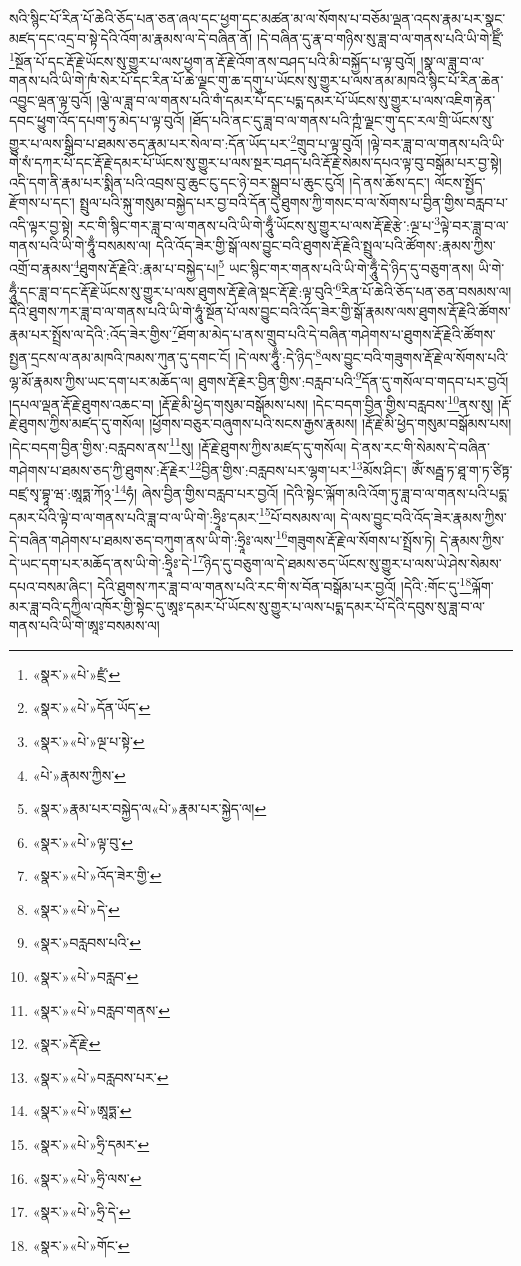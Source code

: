 སའི་སྙིང་པོ་རིན་པོ་ཆེའི་ཅོད་པན་ཅན་ཞལ་དང་ཕྱག་དང་མཚན་མ་ལ་སོགས་པ་བཅོམ་ལྡན་འདས་རྣམ་པར་སྣང་མཛད་དང་འདྲ་བ་སྟེ་དེའི་འོག་མ་རྣམས་ལ་དེ་བཞིན་ནོ། །དེ་བཞིན་དུ་རྣ་བ་གཉིས་སུ་ཟླ་བ་ལ་གནས་པའི་ཡི་གེ་ཛྲིཾ་\footnote{«སྣར་»«པེ་»ཛྲཾ་}སྔོན་པོ་དང་རྡོ་རྗེ་ཡོངས་སུ་གྱུར་པ་ལས་ཕྱག་ན་རྡོ་རྗེ་འོག་ནས་བཤད་པའི་མི་བསྐྱོད་པ་ལྟ་བུའོ། །སྣ་ལ་ཟླ་བ་ལ་གནས་པའི་ཡི་གེ་ཁཾ་སེར་པོ་དང་རིན་པོ་ཆེ་ལྗང་གུ་ཆ་དགུ་པ་ཡོངས་སུ་གྱུར་པ་ལས་ནམ་མཁའི་སྙིང་པོ་རིན་ཆེན་འབྱུང་ལྡན་ལྟ་བུའོ། །ལྕེ་ལ་ཟླ་བ་ལ་གནས་པའི་གཾ་དམར་པོ་དང་པདྨ་དམར་པོ་ཡོངས་སུ་གྱུར་པ་ལས་འཇིག་རྟེན་དབང་ཕྱུག་འོད་དཔག་ཏུ་མེད་པ་ལྟ་བུའོ། །ཐོད་པའི་ནང་དུ་ཟླ་བ་ལ་གནས་པའི་ཀྵཾ་ལྗང་གུ་དང་རལ་གྲི་ཡོངས་སུ་གྱུར་པ་ལས་སྒྲིབ་པ་ཐམས་ཅད་རྣམ་པར་སེལ་བ་:དོན་ཡོད་པར་\footnote{«སྣར་»«པེ་»དོན་ཡོད་}གྲུབ་པ་ལྟ་བུའོ། །ལྟེ་བར་ཟླ་བ་ལ་གནས་པའི་ཡི་གེ་སཾ་དཀར་པོ་དང་རྡོ་རྗེ་དམར་པོ་ཡོངས་སུ་གྱུར་པ་ལས་སྔར་བཤད་པའི་རྡོ་རྗེ་སེམས་དཔའ་ལྟ་བུ་བསྒོམ་པར་བྱ་སྟེ། འདི་དག་ནི་རྣམ་པར་སྨིན་པའི་འབྲས་བུ་ཆུང་ངུ་དང་ཉེ་བར་སྒྲུབ་པ་ཆུང་ངུའོ། །དེ་ནས་ཆོས་དང་། ལོངས་སྤྱོད་རྫོགས་པ་དང་། སྤྲུལ་པའི་སྐུ་གསུམ་བསྐྱེད་པར་བྱ་བའི་དོན་དུ་ཐུགས་ཀྱི་གསང་བ་ལ་སོགས་པ་བྱིན་གྱིས་བརླབ་པ་འདི་ལྟར་བྱ་སྟེ། རང་གི་སྙིང་གར་ཟླ་བ་ལ་གནས་པའི་ཡི་གེ་ཧཱུྃ་ཡོངས་སུ་གྱུར་པ་ལས་རྡོ་རྗེ་རྩེ་:ལྔ་པ་\footnote{«སྣར་»«པེ་»ལྔ་པ་སྟེ་}ལྟེ་བར་ཟླ་བ་ལ་གནས་པའི་ཡི་གེ་ཧཱུྃ་བསམས་ལ། དེའི་འོད་ཟེར་གྱི་སྒོ་ལས་བྱུང་བའི་ཐུགས་རྡོ་རྗེའི་སྤྲུལ་པའི་ཚོགས་:རྣམས་ཀྱིས་འགྲོ་བ་རྣམས་\footnote{«པེ་»རྣམས་ཀྱིས་}ཐུགས་རྡོ་རྗེའི་:རྣམ་པ་བསྐྱེད་པ།\footnote{«སྣར་»རྣམ་པར་བསྐྱེད་ལ«པེ་»རྣམ་པར་སྐྱེད་ལ།} ཡང་སྙིང་གར་གནས་པའི་ཡི་གེ་ཧཱུྃ་དེ་ཉིད་དུ་བཅུག་ནས། ཡི་གེ་ཧཱུྃ་དང་ཟླ་བ་དང་རྡོ་རྗེ་ཡོངས་སུ་གྱུར་པ་ལས་ཐུགས་རྡོ་རྗེ་ཞེ་སྡང་རྡོ་རྗེ་:ལྟ་བུའི་\footnote{«སྣར་»«པེ་»ལྟ་བུ་}རིན་པོ་ཆེའི་ཅོད་པན་ཅན་བསམས་ལ། དེའི་ཐུགས་ཀར་ཟླ་བ་ལ་གནས་པའི་ཡི་གེ་ཧཱུཾ་སྔོན་པོ་ལས་བྱུང་བའི་འོད་ཟེར་གྱི་སྒོ་རྣམས་ལས་ཐུགས་རྡོ་རྗེའི་ཚོགས་རྣམ་པར་སྤྲོས་ལ་དེའི་:འོད་ཟེར་གྱིས་\footnote{«སྣར་»«པེ་»འོད་ཟེར་གྱི་}ཐོག་མ་མེད་པ་ནས་གྲུབ་པའི་དེ་བཞིན་གཤེགས་པ་ཐུགས་རྡོ་རྗེའི་ཚོགས་སྤྱན་དྲངས་ལ་ནམ་མཁའི་ཁམས་ཀུན་དུ་དགང་ངོ། །དེ་ལས་ཧཱུྃ་:དེ་ཉིད་\footnote{«སྣར་»«པེ་»དེ་}ལས་བྱུང་བའི་གཟུགས་རྡོ་རྗེ་ལ་སོགས་པའི་ལྷ་མོ་རྣམས་ཀྱིས་ཡང་དག་པར་མཆོད་ལ། ཐུགས་རྡོ་རྗེར་བྱིན་གྱིས་:བརླབ་པའི་\footnote{«སྣར་»བརླབས་པའི་}དོན་དུ་གསོལ་བ་གདབ་པར་བྱའོ། །དཔལ་ལྡན་རྡོ་རྗེ་ཐུགས་འཆང་བ། །རྡོ་རྗེ་མི་ཕྱེད་གསུམ་བསྒོམས་པས། །དེང་བདག་བྱིན་གྱིས་བརླབས་\footnote{«སྣར་»«པེ་»བརླབ་}ནས་སུ། །རྡོ་རྗེ་ཐུགས་ཀྱིས་མཛད་དུ་གསོལ། །ཕྱོགས་བཅུར་བཞུགས་པའི་སངས་རྒྱས་རྣམས། །རྡོ་རྗེ་མི་ཕྱེད་གསུམ་བསྒོམས་པས། །དེང་བདག་བྱིན་གྱིས་:བརླབས་ནས་\footnote{«སྣར་»«པེ་»བརླབ་གནས་}སུ། །རྡོ་རྗེ་ཐུགས་ཀྱིས་མཛད་དུ་གསོལ། དེ་ནས་རང་གི་སེམས་དེ་བཞིན་གཤེགས་པ་ཐམས་ཅད་ཀྱི་ཐུགས་:རྡོ་རྗེར་\footnote{«སྣར་»རྡོ་རྗེ་}བྱིན་གྱིས་:བརླབས་པར་ལྷག་པར་\footnote{«སྣར་»«པེ་»བརླབས་པར་}མོས་ཤིང་། ཨོཾ་སརྦྦ་ཏ་ཐཱ་ག་ཏ་ཙིཏྟ་བཛྲ་སྭ་བྷཱ་ཝ་:ཨཱཏྨ་ཀོ྅་\footnote{«སྣར་»«པེ་»ཨཱཏྨ་}ཧཾ། ཞེས་བྱིན་གྱིས་བརླབ་པར་བྱའོ། །དེའི་སྟེང་ལྐོག་མའི་འོག་ཏུ་ཟླ་བ་ལ་གནས་པའི་པདྨ་དམར་པོའི་ལྟེ་བ་ལ་གནས་པའི་ཟླ་བ་ལ་ཡི་གེ་:ཧྲཱིཿ་དམར་\footnote{«སྣར་»«པེ་»ཧྲི་དམར་}པོ་བསམས་ལ། དེ་ལས་བྱུང་བའི་འོད་ཟེར་རྣམས་ཀྱིས་དེ་བཞིན་གཤེགས་པ་ཐམས་ཅད་བཀུག་ནས་ཡི་གེ་:ཧྲཱིཿ་ལས་\footnote{«སྣར་»«པེ་»ཧྲི་ལས་}གཟུགས་རྡོ་རྗེ་ལ་སོགས་པ་སྤྲོས་ཏེ། དེ་རྣམས་ཀྱིས་དེ་ཡང་དག་པར་མཆོད་ནས་ཡི་གེ་:ཧྲཱིཿ་དེ་\footnote{«སྣར་»«པེ་»ཧྲི་དེ་}ཉིད་དུ་བཅུག་ལ་དེ་ཐམས་ཅད་ཡོངས་སུ་གྱུར་པ་ལས་ཡེ་ཤེས་སེམས་དཔའ་བསམ་ཞིང་། དེའི་ཐུགས་ཀར་ཟླ་བ་ལ་གནས་པའི་རང་གི་ས་བོན་བསྒོམ་པར་བྱའོ། །དེའི་:གོང་དུ་\footnote{«སྣར་»«པེ་»གོང་}ལྐོག་མར་ཟླ་བའི་དཀྱིལ་འཁོར་གྱི་སྟེང་དུ་ཨཱཿ་དམར་པོ་ཡོངས་སུ་གྱུར་པ་ལས་པདྨ་དམར་པོ་དེའི་དབུས་སུ་ཟླ་བ་ལ་གནས་པའི་ཡི་གེ་ཨཱཿ་བསམས་ལ། 